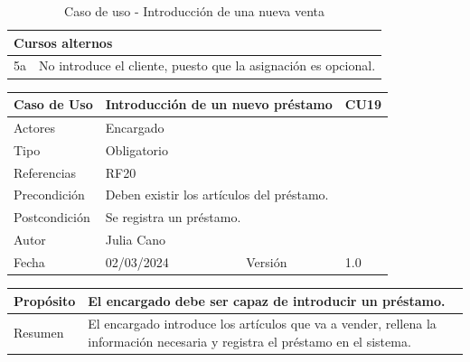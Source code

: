 \begin{table}[H]
	\centering
	\begin{tabular}{| m{} | m{} | m{} | m{} |}
		\hline
		\multicolumn{4}{|m{0.9\textwidth}|}{Cursos alternos}     \\ 
		\hline
		5a & \multicolumn{3}{m{0.67\textwidth}|}{No introduce el cliente, puesto que la asignación es opcional.} \\ 
		\hline
	\end{tabular}
	\caption{Caso de uso - Introducción de una nueva venta}
\end{table}

\newpage


\begin{table}[H]
	\centering
	\begin{tabular}{| m{} | m{} | m{} | m{}|}
		\hline
		\rowcolor{grayshade} Caso de Uso & \multicolumn{2}{|m{0.43\textwidth}|}{Introducción de un nuevo préstamo} &  CU19\\ 
		\hline
		Actores & \multicolumn{3}{l|}{Encargado} \\ 
		\hline
		Tipo & \multicolumn{3}{l|}{Obligatorio} \\ 
		\hline
		Referencias & \multicolumn{3}{l|}{RF20} \\ 
		\hline
		Precondición & \multicolumn{3}{m{0.67\textwidth}|}{Deben existir los artículos del préstamo.} \\ 
		\hline
		Postcondición & \multicolumn{3}{m{0.67\textwidth}|}{Se registra un préstamo.} \\ 
		\hline
		Autor & \multicolumn{3}{l|}{Julia Cano} \\ 
		\hline
		Fecha & 02/03/2024 & Versión & 1.0 \\
		\hline
	\end{tabular}
\end{table}

\begin{table}[H]
	\centering
	\begin{tabular}{| m{} | m{} | m{} | m{} |}
		\hline
		Propósito & \multicolumn{3}{m{0.67\textwidth}|}{El encargado debe ser capaz de introducir un préstamo.}  \\ 
		\hline
		Resumen & \multicolumn{3}{m{0.67\textwidth}|}{El encargado introduce los artículos que va a vender, rellena la información necesaria y registra el préstamo en el sistema.} \\ 
		\hline
	\end{tabular}
\end{table}


